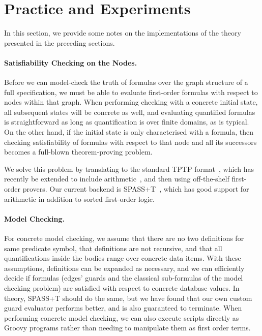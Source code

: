 \documentclass{llncs}
\begin{document}
{\section{Practice and Experiments}
\label{sec:experiments}

In this section, we provide some notes on the implementations of the theory presented
in the preceding sections.  

\paragraph{Satisfiability Checking on the Nodes.}
Before we can model-check the truth of formulas over the graph structure of a full
specification, we must be able to evaluate first-order formulas with respect to nodes
within that graph.  When performing checking with a concrete initial state, all
subsequent states will be concrete as well, and evaluating quantified formulas is
straightforward as long as quantification is over finite domains, as is typical.
On the other hand, if the initial state is only characterised with a formula, then
checking satisfiability of formulas with respect to that node and all its successors
becomes a full-blown theorem-proving problem.

We solve this problem by translating to the standard TPTP format~\cite{tptp2009},
which has recently be extended to include
arithmetic~\cite{Sutcliffe:etal:TPTP-TFFA:LPAR:2012}, and then using off-the-shelf
first-order provers.  Our current backend is SPASS+T~\cite{SPASST2006}, which has
good support for arithmetic in addition to sorted first-order logic.


\paragraph{Model Checking.}
For concrete model checking, we assume that there are no two definitions for same predicate symbol, that
definitions are not recursive, and that all quantifications inside the bodies 
range over concrete data items.  With these assumptions, definitions can be expanded
as necessary, and we can efficiently decide if formulas (edges' guards and the
classical sub-formulas of the model checking problem) are satisfied with respect to
concrete database values.  In theory, SPASS+T should do the same, but we have found
that our own custom guard evaluator performs better, and is also guaranteed to
terminate.  When performing concrete model checking, we can also execute scripts
directly as Groovy programs rather than needing to manipulate them as first order
terms.  

}
\end{document}
